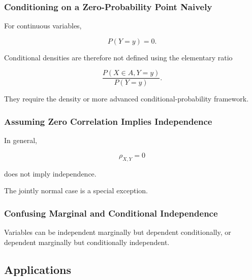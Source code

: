 \subsubsection{Conditioning on a Zero-Probability Point Naively}

For continuous variables,

\[
P(Y=y)=0.
\]

Conditional densities are therefore not defined using the elementary
ratio

\[
\frac{P(X\in A,Y=y)}{P(Y=y)}.
\]

They require the density or more advanced conditional-probability
framework.

\subsubsection{Assuming Zero Correlation Implies Independence}

In general,

\[
\rho_{X,Y}=0
\]

does not imply independence.

The jointly normal case is a special exception.

\subsubsection{Confusing Marginal and Conditional Independence}

Variables can be independent marginally but dependent conditionally, or
dependent marginally but conditionally independent.

\subsection{Applications}
\label{subsec:joint-distributions-applications}

